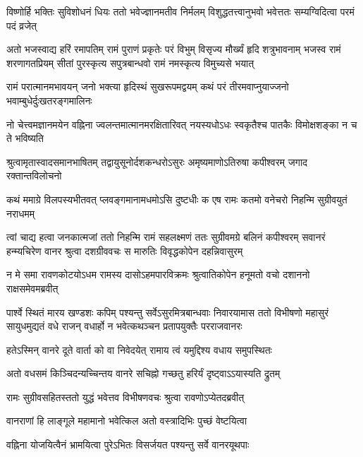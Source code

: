 \fourlineindentedshloka
{विष्णोर्हि भक्तिः सुविशोधनं धियः}
{ततो भवेज्ज्ञानमतीव निर्मलम्}
{विशुद्धतत्त्वानुभवो भवेत्ततः}
{सम्यग्विदित्वा परमं पदं व्रजेत्} %

\fourlineindentedshloka
{अतो भजस्वाद्य हरिं रमापतिम्}
{रामं पुराणं प्रकृतेः परं विभुम्}
{विसृज्य मौर्ख्यं हृदि शत्रुभावनाम्}
{भजस्व रामं शरणागतप्रियम्}
{सीतां पुरस्कृत्य सपुत्रबान्धवो}
{रामं नमस्कृत्य विमुच्यसे भयात्} %

\fourlineindentedshloka
{रामं परात्मानमभावयन् जनो}
{भक्त्या हृदिस्थं सुखरूपमद्वयम्}
{कथं परं तीरमवाप्नुयाज्जनो}
{भवाम्बुधेर्दुःखतरङ्गमालिनः} %

\fourlineindentedshloka
{नो चेत्त्वमज्ञानमयेन वह्निना}
{ज्वलन्तमात्मानमरक्षितारिवत्}
{नयस्यधोऽधः स्वकृतैश्च पातकैः}
{विमोक्षशङ्का न च ते भविष्यति} %

\fourlineindentedshloka
{श्रुत्वामृतास्वादसमानभाषितम्}
{तद्वायुसूनोर्दशकन्धरोऽसुरः}
{अमृष्यमाणोऽतिरुषा कपीश्वरम्}
{जगाद रक्तान्तविलोचनो} %

\fourlineindentedshloka
{कथं ममाग्रे विलपस्यभीतवत्}
{प्लवङ्गमानामधमोऽसि दुष्टधीः}
{क एष रामः कतमो वनेचरो}
{निहन्मि सुग्रीवयुतं नराधमम्} %

\fourlineindentedshloka
{त्वां चाद्य हत्वा जनकात्मजां ततो}
{निहन्मि रामं सहलक्ष्मणं ततः}
{सुग्रीवमग्रे बलिनं कपीश्वरम्}
{सवानरं हन्म्यचिरेण वानर}
{श्रुत्वा दशग्रीववचः स मारुतिः}
{विवृद्धकोपेन दहन्निवासुरम्} %

\fourlineindentedshloka
{न मे समा रावणकोटयोऽधम}
{रामस्य दासोऽहमपारविक्रमः}
{श्रुत्वातिकोपेन हनूमतो वचो}
{दशाननो राक्षसमेवमब्रवीत्} %

\fourlineindentedshloka
{पार्श्वे स्थितं मारय खण्डशः कपिम्}
{पश्यन्तु सर्वेऽसुरमित्रबान्धवाः}
{निवारयामास ततो विभीषणो}
{महासुरं सायुधमुद्यतं वधे}
{राजन् वधार्हो न भवेत्कथञ्चन}
{प्रतापयुक्तैः परराजवानरः} %

\twolineshloka
{हतेऽस्मिन् वानरे दूते वार्ता को वा निवेदयेत्}
{रामाय त्वं यमुद्दिश्य वधाय समुपस्थितः} %

\twolineshloka
{अतो वधसमं किञ्चिदन्यच्चिन्तय वानरे}
{सचिह्नो गच्छतु हरिर्यं दृष्ट्वाऽऽयास्यति द्रुतम्} %

\twolineshloka
{रामः सुग्रीवसहितस्ततो युद्धं भवेत्तव}
{विभीषणवचः श्रुत्वा रावणोऽप्येतदब्रवीत्} %

\twolineshloka
{वानराणां हि लाङ्गूले महामानो भवेत्किल}
{अतो वस्त्रादिभिः पुच्छं वेष्टयित्वा} %

\twolineshloka
{वह्निना योजयित्वैनं भ्रामयित्वा पुरेऽभितः}
{विसर्जयत पश्यन्तु सर्वे वानरयूथपाः} %

